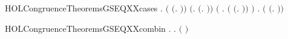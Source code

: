 \begin{SaveVerbatim}{HOLCongruenceTheoremsGSEQXXcases}
\HOLTokenTurnstile{} \HOLSymConst{\HOLTokenForall{}}.
         \HOLSymConst{\HOLTokenEquiv{}}
       \ensuremath{(} \HOLSymConst{\ensuremath{=}} \ensuremath{(}\HOLTokenLambda{}. \ensuremath{)}\ensuremath{)} \HOLSymConst{\HOLTokenDisj{}} \ensuremath{(}\HOLSymConst{\HOLTokenExists{}}.  \HOLSymConst{\ensuremath{=}} \ensuremath{(}\HOLTokenLambda{}. \ensuremath{)}\ensuremath{)} \HOLSymConst{\HOLTokenDisj{}}
       \ensuremath{(}\HOLSymConst{\HOLTokenExists{}} . \ensuremath{(} \HOLSymConst{\ensuremath{=}} \ensuremath{(}\HOLTokenLambda{}. \HOLSymConst{\ensuremath{\ldotp}} \ensuremath{)}\ensuremath{)} \HOLSymConst{\HOLTokenConj{}}  \ensuremath{)} \HOLSymConst{\HOLTokenDisj{}}
       \HOLSymConst{\HOLTokenExists{}}   .
           \ensuremath{(} \HOLSymConst{\ensuremath{=}} \ensuremath{(}\HOLTokenLambda{}. \HOLSymConst{\ensuremath{\ldotp}}  \HOLSymConst{\ensuremath{+}} \HOLSymConst{\ensuremath{\ldotp}} \ensuremath{)}\ensuremath{)} \HOLSymConst{\HOLTokenConj{}}   \HOLSymConst{\HOLTokenConj{}}  
\end{SaveVerbatim}
\newcommand{\HOLCongruenceTheoremsGSEQXXcases}{\UseVerbatim{HOLCongruenceTheoremsGSEQXXcases}}
\begin{SaveVerbatim}{HOLCongruenceTheoremsGSEQXXcombin}
\HOLTokenTurnstile{} \HOLSymConst{\HOLTokenForall{}}.   \HOLSymConst{\HOLTokenImp{}} \HOLSymConst{\HOLTokenForall{}}.   \HOLSymConst{\HOLTokenImp{}}  \ensuremath{(} \HOLConst{\HOLTokenCompose} \ensuremath{)}
\end{SaveVerbatim}
\newcommand{\HOLCongruenceTheoremsGSEQXXcombin}{\UseVerbatim{HOLCongruenceTheoremsGSEQXXcombin}}
